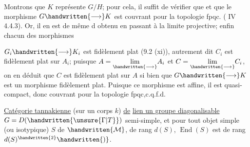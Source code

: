 Montrons que $K$ représente $G/H$; pour cela, il suffit de vérifier que 
\handwritten{,} et que le morphisme $G\handwritten{\longrightarrow}K$ est couvrant pour la topologie fpqc. ( IV 4.4.3). Or, 
\handwritten{,} il en est de même d  obtenu en passant à la limite projective; enfin chacun des morphismes

$G_i\handwritten{\longrightarrow}K_i$ est fidèlement plat (9.2 (xi)), autrement dit $C_i$ est fidèlement plat sur $A_i$; puisque $A=\underset{\handwritten{\longrightarrow}}{\lim}A_i$ et $C=\underset{\handwritten{\longrightarrow}}{\lim}C_i$, on en déduit que $C$ est fidèlement plat sur $A$\handwritten{,} si bien que $G\handwritten{\longrightarrow}K$ est un morphisme fidèlement plat. Puisque ce morphisme est affine, il est quasi-compact, donc couvrant pour la topologie fpqc,c.q.f.d.

\uline{Catégorie tannakienne} (sur un corps $k$) \uline{de}  \uline{lien un groupe diagonalisable} $G=D(\handwritten{\unsure{\Gamma|T}})$  semi-simple, et pour tout objet simple (ou isotypique) $S$ de $\handwritten{\mathcal{M}}$, de rang $d(S)$, $\operatorname{End}(S)$ est de rang $d(S)^{\handwritten{2}}\handwritten{)}$.

